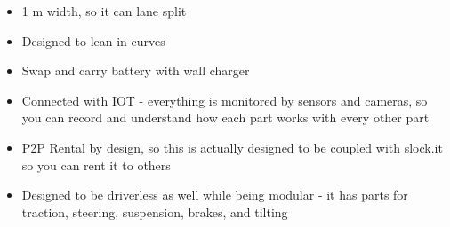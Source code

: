 \documentclass{article}
\begin{document}
\begin{itemize}
\begin{itemize}
\begin{itemize}
          \item 1 m width, so it can lane split
          \item Designed to lean in curves
          \item Swap and carry battery with wall charger
          \item Connected with IOT - everything is monitored by sensors and cameras, so you can record and understand how each part works
            with every other part
          \item P2P Rental by design, so this is actually designed to be coupled with slock.it so you can rent it to others
          \item Designed to be driverless as well while being modular - it has parts for traction, steering, suspension, brakes, and tilting
        \end{itemize}
    \end{itemize}
  
\end{itemize}
\end{document}
